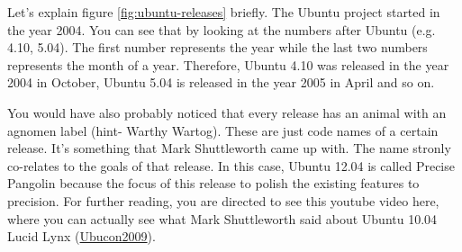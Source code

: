 \par \noindent Let's explain figure \ref{fig:ubuntu-releases} briefly. The Ubuntu project started in the year 2004. You can see that by looking at the numbers after Ubuntu (e.g. 4.10, 5.04). The first number represents the year while the last two numbers represents the month of a year. Therefore, Ubuntu 4.10 was released in the year 2004 in October, Ubuntu 5.04 is released in the year 2005 in April and so on. \\

\par \noindent You would have also probably noticed that every release has an animal with an agnomen label (hint- Warthy Wartog). These are just code names of a certain release. It's something that Mark Shuttleworth came up with. The name stronly co-relates to the goals of that release. In this case, Ubuntu 12.04 is called Precise Pangolin because the focus of this release to polish the existing features to precision. For further reading, you are directed to see this youtube video here, where you can actually see what Mark Shuttleworth said about Ubuntu 10.04 Lucid Lynx (\href{http://www.youtube.com/watch?v=l02bhwofEqw}{Ubucon2009}). \\




